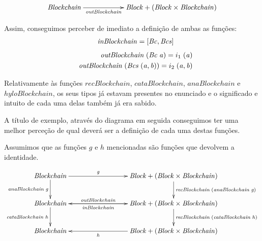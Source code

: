 \documentclass[a4paper]{article}
\newcommand{\Conid}[1]{\mathit{#1}}
\newcommand{\Varid}[1]{\mathit{#1}}
\begin{document}
\begin{eqnarray*}
\xymatrix@C=2cm{
     \ensuremath{\Conid{Blockchain}}
           \ar[r]_-{\ensuremath{\Varid{outBlockchain}}}
&
     \ensuremath{\Conid{Block}\mathbin{+}(\Conid{Block}\times\Conid{Blockchain})}
}
\end{eqnarray*}

Assim, conseguimos perceber de imediato a definição de ambas as funções:
\begin{eqnarray*}
\start
\ensuremath{\Varid{inBlockchain}\mathrel{=}\alt{\Conid{Bc}}{\Conid{Bcs}}}
\end{eqnarray*}
\begin{eqnarray*}
\start
\ensuremath{\Varid{outBlockchain}\;(\Conid{Bc}\;\Varid{a})\mathrel{=}i_1\;(\Varid{a})}
\more
\ensuremath{\Varid{outBlockchain}\;(\Conid{Bcs}\;(\Varid{a},\Varid{b}))\mathrel{=}i_2\;(\Varid{a},\Varid{b})}
\end{eqnarray*}

Relativamente às funções \ensuremath{\Varid{recBlockchain}}, \ensuremath{\Varid{cataBlockchain}},
\ensuremath{\Varid{anaBlockchain}} e \ensuremath{\Varid{hyloBlockchain}}, os seus tipos já estavam presentes
no enunciado e o significado e intuito de cada uma delas também já era sabido.

A título de exemplo, através do diagrama em seguida conseguimos ter uma
melhor perceção de qual deverá ser a definição de cada uma destas funções.

Assumimos que as funções \ensuremath{\Varid{g}} e \ensuremath{\Varid{h}} mencionadas são funções que devolvem
a identidade.


\begin{eqnarray*}
\xymatrix@C=3cm{
   \ensuremath{\Conid{Blockchain}}
          \ar[d]_-{\ensuremath{\Varid{anaBlockchain}\;\Varid{g}}}
           \ar[r]^-{\ensuremath{\Varid{g}}}
&
   \ensuremath{\Conid{Block}\mathbin{+}(\Conid{Block}\times\Conid{Blockchain})}
          \ar[d]^{\ensuremath{\Varid{recBlockchain}\;(\Varid{anaBlockchain}\;\Varid{g})}}
\\
    \ensuremath{\Conid{Blockchain}}
       \ar[d]_-{\ensuremath{\Varid{cataBlockchain}\;\Varid{h}}}
       \ar[r]^-{\ensuremath{\Varid{outBlockchain}}}
&
    \ensuremath{\Conid{Block}\mathbin{+}(\Conid{Block}\times\Conid{Blockchain})}
          \ar[l]^-{\ensuremath{\Varid{inBlockchain}}}
           \ar[d]^{\ensuremath{\Varid{recBlockchain}\;(\Varid{cataBlockchain}\;\Varid{h})}}
\\
   \ensuremath{\Conid{Blockchain}}
&
   \ensuremath{\Conid{Block}\mathbin{+}(\Conid{Block}\times\Conid{Blockchain})}
       \ar[l]^-{\ensuremath{\Varid{h}}}
}
\end{eqnarray*}
\end{document}
